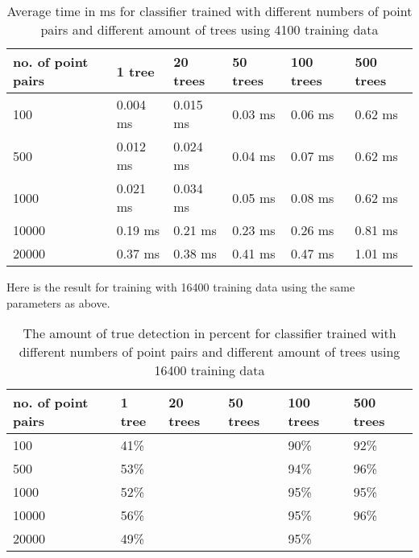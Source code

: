 \begin{table}[H]
\begin{center}
     \begin{tabular}{| l | l | l | l | l | l | }
     \hline
     no. of point pairs & 1 tree & 20 trees & 50 trees & 100 trees & 500 trees \\ \hline
   	 100 & 0.004 ms & 0.015 ms & 0.03 ms & 0.06 ms & 0.62 ms \\ \hline
     500 & 0.012 ms & 0.024 ms & 0.04 ms & 0.07 ms & 0.62 ms\\ \hline
     1000 & 0.021 ms & 0.034 ms & 0.05 ms & 0.08 ms & 0.62 ms \\ \hline
     10000 & 0.19 ms & 0.21 ms & 0.23 ms & 0.26 ms & 0.81 ms \\ \hline
     20000 & 0.37 ms & 0.38 ms & 0.41 ms & 0.47 ms & 1.01 ms	\\ \hline
     \end{tabular}
\end{center}
\caption{Average time in ms for classifier trained with different numbers of point pairs and different amount of trees using 4100 training data}
\end{table}

Here is the result for training with 16400 training data using the same parameters as above.

\begin{table}[H]
\begin{center}
     \begin{tabular}{| l | l | l | l | l | l | }
     \hline
     no. of point pairs & 1 tree & 20 trees & 50 trees & 100 trees & 500 trees \\ \hline
   	 100 & 41\% & & & 90\% & 92\%  	\\ \hline
     500 & 53\% & & & 94\% & 96\%  	\\ \hline
     1000 & 52\% & & & 95\% & 95\%  	\\ \hline
     10000 & 56\% & & & 95\% & 96\% 	\\ \hline
     20000 & 49\% & & & 95\% & 	\\ \hline
     \end{tabular}
\end{center}
\caption{The amount of true detection in percent for classifier trained with different numbers of point pairs and different amount of trees using 16400 training data}
\end{table}

